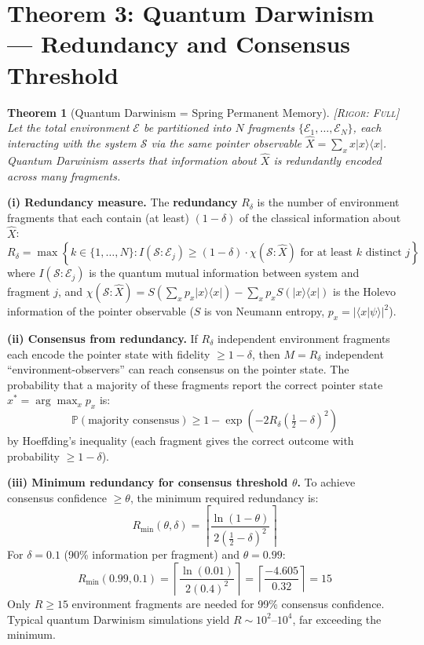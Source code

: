 \documentclass[11pt,a4paper]{article}
\newcommand{\bra}[1]{\langle #1|}
\newcommand{\ket}[1]{|#1\rangle}
\newcommand{\braket}[1]{\langle #1 \rangle}
\newtheorem{theorem}{Theorem}[section]
\theoremstyle{definition}
\theoremstyle{remark}
\newcommand{\Pbb}{\mathbb{P}}
\newcommand{\rigorFull}{\textsc{[Rigor: Full]}}
\begin{document}
\section{Theorem 3: Quantum Darwinism --- Redundancy and Consensus Threshold}

\begin{theorem}[Quantum Darwinism = Spring Permanent Memory]
\label{thm:darwinism-spring}
\rigorFull
Let the total environment $\mathcal{E}$ be partitioned into $N$ fragments $\{\mathcal{E}_1, \ldots, \mathcal{E}_N\}$, each interacting with the system $\mathcal{S}$ via the same pointer observable $\hat{X} = \sum_x x \ket{x}\bra{x}$. Quantum Darwinism asserts that information about $\hat{X}$ is redundantly encoded across many fragments.
\end{theorem}

\medskip
\noindent\textbf{(i) Redundancy measure.}
The \textbf{redundancy} $R_\delta$ is the number of environment fragments that each contain (at least) $(1-\delta)$ of the classical information about $\hat{X}$:
\[
R_\delta = \max\!\left\{k \in \{1,\ldots,N\} : I(\mathcal{S}:\mathcal{E}_j) \geq (1-\delta) \cdot \chi(\mathcal{S}:\hat{X}) \text{ for at least } k \text{ distinct } j\right\}
\]
where $I(\mathcal{S}:\mathcal{E}_j)$ is the quantum mutual information between system and fragment $j$, and $\chi(\mathcal{S}:\hat{X}) = S(\sum_x p_x \ket{x}\bra{x}) - \sum_x p_x S(\ket{x}\bra{x})$ is the Holevo information of the pointer observable ($S$ is von Neumann entropy, $p_x = |\braket{x|\psi}|^2$).

\noindent\textbf{(ii) Consensus from redundancy.}
If $R_\delta$ independent environment fragments each encode the pointer state with fidelity $\geq 1-\delta$, then $M = R_\delta$ independent ``environment-observers'' can reach consensus on the pointer state. The probability that a majority of these fragments report the correct pointer state $x^* = \arg\max_x p_x$ is:
\[
\Pbb(\text{majority consensus}) \geq 1 - \exp\!\left(-2 R_\delta \left(\tfrac{1}{2} - \delta\right)^2\right)
\]
by Hoeffding's inequality (each fragment gives the correct outcome with probability $\geq 1-\delta$).

\noindent\textbf{(iii) Minimum redundancy for consensus threshold $\theta$.}
To achieve consensus confidence $\geq \theta$, the minimum required redundancy is:
\[
R_{\min}(\theta, \delta) = \left\lceil \frac{\ln(1-\theta)}{2(\frac{1}{2} - \delta)^2} \right\rceil
\]
For $\delta = 0.1$ (90\% information per fragment) and $\theta = 0.99$:
\[
R_{\min}(0.99, 0.1) = \left\lceil \frac{\ln(0.01)}{2(0.4)^2} \right\rceil = \left\lceil \frac{-4.605}{0.32} \right\rceil = 15
\]
Only $R \geq 15$ environment fragments are needed for 99\% consensus confidence. Typical quantum Darwinism simulations yield $R \sim 10^2$--$10^4$, far exceeding the minimum.
\end{document}
